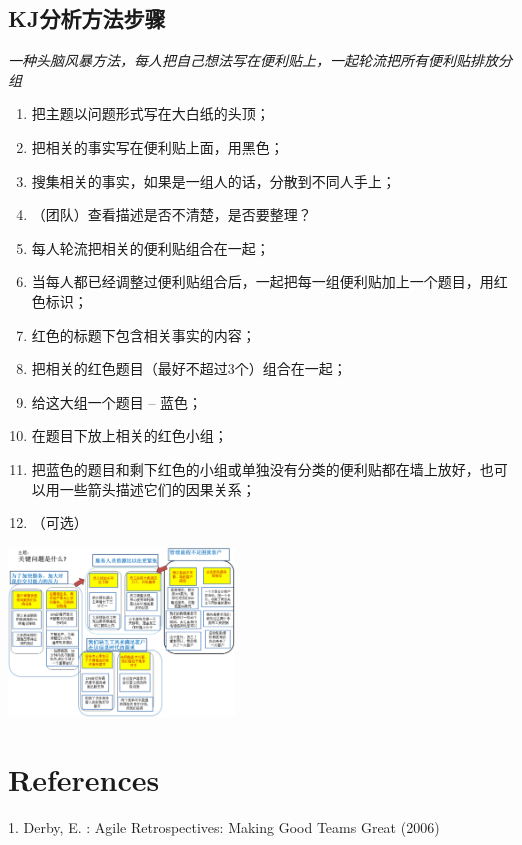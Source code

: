 \hypertarget{kjux6b65ux9aa4}{%
\subsection{KJ分析方法步骤}\label{kjux6b65ux9aa4}}

\emph{一种头脑风暴方法，每人把自己想法写在便利贴上，一起轮流把所有便利贴排放分组}

\begin{enumerate}
\tightlist
\item
  把主题以问题形式写在大白纸的头顶；
\item
  把相关的事实写在便利贴上面，用黑色；
\item
  搜集相关的事实，如果是一组人的话，分散到不同人手上；
\item
  （团队）查看描述是否不清楚，是否要整理？
\item
  每人轮流把相关的便利贴组合在一起；
\item
  当每人都已经调整过便利贴组合后，一起把每一组便利贴加上一个题目，用红色标识；
\item
  红色的标题下包含相关事实的内容；
\item
  把相关的红色题目（最好不超过3个）组合在一起；
\item
  给这大组一个题目 -- 蓝色；
\item
  在题目下放上相关的红色小组；
\item
  把蓝色的题目和剩下红色的小组或单独没有分类的便利贴都在墙上放好，也可以用一些箭头描述它们的因果关系；
\item
  （可选）
\end{enumerate}

\begin{description}
\item[]
\end{description}


\includegraphics[width=6cm]{KJ_10.png}

\hypertarget{references}{%
\section{References}\label{references}}

1. Derby, E. : Agile Retrospectives: Making Good Teams Great (2006)





